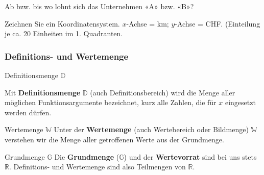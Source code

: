 Ab bzw. bis wo lohnt sich das Unternehmen «A» bzw. «B»?

  Zeichnen Sie ein Koordinatensystem. $x$-Achse = km; $y$-Achse = CHF.
  (Einteilung je ca. 20 Einheiten im 1. Quadranten.

\newpage

\subsubsection{Definitions- und Wertemenge}

\begin{definition}{Definitionsmenge $\mathbb{D}$}{}
  
Mit \textbf{Definitionsmenge} $\mathbb{D}$ (auch
Definitionsbereich) wird die Menge aller
möglichen Funktionsargumente bezeichnet, kurz alle Zahlen, die für $x$
eingesetzt werden dürfen. 
\end{definition}

\begin{definition}{Wertemenge $\mathbb{W}$}{}
Unter der \textbf{Wertemenge} (auch Wertebereich oder Bildmenge) $\mathbb{W}$
verstehen wir die Menge aller getroffenen Werte aus der
Grundmenge.
\end{definition}

\begin{definition}{Grundmenge $\mathbb{G}$}{}
Die \textbf{Grundmenge} ($\mathbb{G}$) und der \textbf{Wertevorrat}
sind bei uns stets $\mathbb{R}$. Definitions- und Wertemenge sind also
Teilmengen von $\mathbb{R}$.
\end{definition}
\newpage

